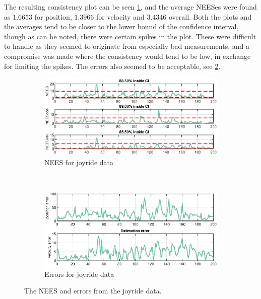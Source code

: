 The resulting consistency plot can be seen \cref{fig:ga_1_joyride_NEES}, and the average NEESes were found as $1.6653$ for position, $1.3966$ for velocity and $3.4346$ overall. Both the plots and the averages tend to be closer to the lower bound of the confidence interval, though as can be noted, there were certain spikes in the plot. These were difficult to handle as they seemed to originate from especially bad measurements, and a compromise was made where the consistency would tend to be low, in exchange for limiting the spikes. The errors also seemed to be acceptable, see \cref{fig:ga_1_joyride_error}. 

\begin{figure}[ht]
    \centering
	\begin{subfigure}[h]{0.4\textwidth}
		\includegraphics[width=\textwidth]{figures/ga_1/joyride_NEES}
		\caption{NEES for joyride data}
		\label{fig:ga_1_joyride_NEES}
    \end{subfigure}%
    ~
    \begin{subfigure}[h]{0.4\textwidth}
        \includegraphics[width=\textwidth]{figures/ga_1/joyride_error}
        \caption{Errors for joyride data}
        \label{fig:ga_1_joyride_error}
    \end{subfigure}
    \caption{The NEES and errors from the joyride data. }
    \label{fig:ga_1_joyride_NEES_and_error} 
\end{figure}

